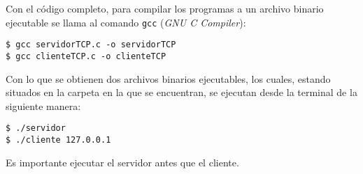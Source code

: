 Con el código completo, para compilar los programas a un archivo binario ejecutable se llama al comando \texttt{gcc} (\textit{GNU C Compiler}):

\begin{center}
    \texttt{\$ gcc servidorTCP.c -o servidorTCP}\\
    \texttt{\$ gcc clienteTCP.c -o clienteTCP}\\
\end{center}

Con lo que se obtienen dos archivos binarios ejecutables, los cuales, estando situados en la carpeta en la que se encuentran, se ejecutan desde la terminal de la siguiente manera:

\begin{center}
    \texttt{\$ ./servidor}\\
    \texttt{\$ ./cliente 127.0.0.1}\\
\end{center}

Es importante ejecutar el servidor antes que el cliente.